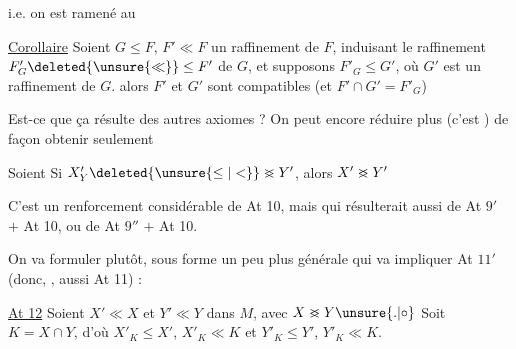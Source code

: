 i.e. on est ramené au

\uline{Corollaire} Soient $G\leq F$, $F'\ll F$ un raffinement de $F$, induisant le raffinement $F'_G\deleted{\unsure{\ll}}\leq F'$ de $G$, et  supposons $F'_G\leq G'$, où $G'$ est un raffinement de $G$. alors  $F'$ et $G'$ sont compatibles (et $F'\cap G'=F'_G$) 

Est-ce que ça résulte des autres axiomes ?  On peut encore réduire plus (c'est ) de façon  obtenir seulement

  Soient
Si $X'_Y\deleted{\unsure{\leq|<}}\mathrel{>\mkern-14mu<}Y'$, alors $X'\mathrel{>\mkern-14mu<}Y'$

C'est  un renforcement considérable de At 10, mais qui résulterait aussi de At $9'$ $+$ At 10, ou de At $9''$ $+$ At 10.

On va formuler plutôt, sous forme un peu plus générale qui va impliquer At $11'$ (donc, , aussi At 11) :

\uline{At 12} Soient $X'\ll X$ et $Y'\ll Y$ dans $M$,  avec $X\mathrel{>\mkern-14mu<}Y\unsure{\mathord{.}|\circ}$ Soit $K=X\cap Y$, d'où $X'_K\leq X'$, $X'_K\ll K$ et $Y'_K\leq Y'$, $Y'_K\ll K$. 
